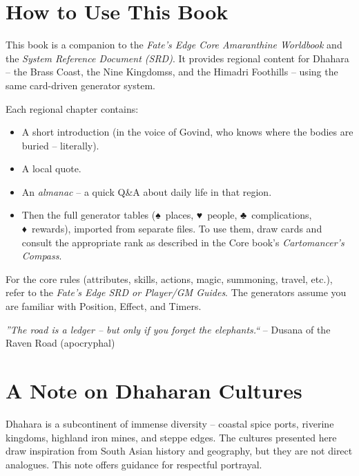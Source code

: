 \documentclass[12pt,oneside]{book}
\newcommand{\spadesuit}{♠}
\newcommand{\heartsuit}{♥}
\newcommand{\clubsuit}{♣}
\newcommand{\diamondsuit}{♦}
\begin{document}
\chapter*{How to Use This Book}

This book is a companion to the \textit{Fate's Edge Core Amaranthine Worldbook} and the \textit{System Reference Document (SRD)}. It provides regional content for Dhahara -- the Brass Coast, the Nine Kingdomss, and the Himadri Foothills -- using the same card-driven generator system.

Each regional chapter contains:
\begin{itemize}
  \item A short introduction (in the voice of Govind, who knows where the bodies are buried -- literally).
  \item A local quote.
  \item An \emph{almanac} -- a quick Q\&A about daily life in that region.
  \item Then the full generator tables (\spadesuit\ places, \heartsuit\ people, \clubsuit\ complications, \diamondsuit\ rewards), imported from separate files. To use them, draw cards and consult the appropriate rank as described in the Core book's \textit{Cartomancer's Compass}.
\end{itemize}

For the core rules (attributes, skills, actions, magic, summoning, travel, etc.), refer to the \textit{Fate's Edge SRD or Player/GM Guides}. The generators assume you are familiar with Position, Effect, and Timers.

\vspace{1em}
\noindent\textit{''The road is a ledger -- but only if you forget the elephants.``} -- Dusana of the Raven Road (apocryphal)

\chapter*{A Note on Dhaharan Cultures}

Dhahara is a subcontinent of immense diversity -- coastal spice ports, riverine kingdoms, highland iron mines, and steppe edges. The cultures presented here draw inspiration from South Asian history and geography, but they are not direct analogues. This note offers guidance for respectful portrayal.
\end{document}
